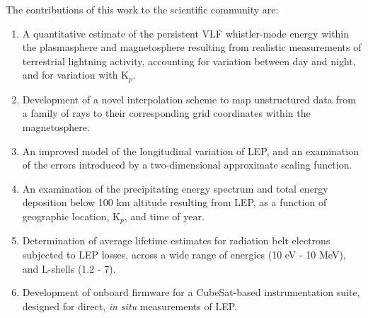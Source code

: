 The contributions of this work to the scientific community are:
\begin{enumerate}
\item A quantitative estimate of the persistent VLF whistler-mode energy within the plasmasphere and magnetosphere resulting from realistic measurements of terrestrial lightning activity, accounting for variation between day and night, and for variation with K$_p$.

\item Development of a novel interpolation scheme to map unstructured data from a family of rays to their corresponding grid coordinates within the magnetosphere.

\item An improved model of the longitudinal variation of LEP, and an examination of the errors introduced by a two-dimensional approximate scaling function.

\item An examination of the precipitating energy spectrum and total energy deposition below 100 km altitude resulting from LEP, as a function of geographic location, K$_p$, and time of year.

\item Determination of average lifetime estimates for radiation belt electrons subjected to LEP losses, across a wide range of energies (10 eV - 10 MeV), and L-shells (1.2 - 7).

\item Development of onboard firmware for a CubeSat-based instrumentation suite, designed for direct, \emph{in situ} measurements of LEP.
\end{enumerate}

